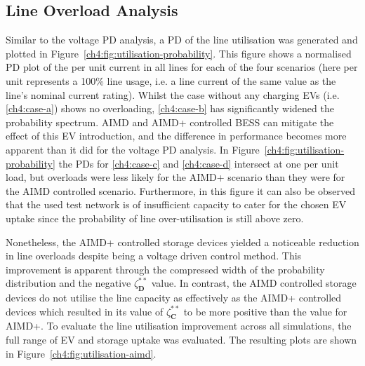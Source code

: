 \subsection{Line Overload Analysis}



Similar to the voltage PD analysis, a PD of the line utilisation was generated and plotted in Figure~\ref{ch4:fig:utilisation-probability}.
This figure shows a normalised PD plot of the per unit current in all lines for each of the four scenarios (here per unit represents a 100\% line usage, i.e. a line current of the same value as the line's nominal current rating).
Whilst the case without any charging EVs (i.e. \ref{ch4:case-a}) shows no overloading, \ref{ch4:case-b} has significantly widened the probability spectrum.
AIMD and AIMD+ controlled BESS can mitigate the effect of this EV introduction, and the difference in performance becomes more apparent than it did for the voltage PD analysis.
In Figure~\ref{ch4:fig:utilisation-probability} the PDs for \ref{ch4:case-c} and \ref{ch4:case-d} intersect at one per unit load, but overloads were less likely for the AIMD+ scenario than they were for the AIMD controlled scenario.
Furthermore, in this figure it can also be observed that the used test network is of insufficient capacity to cater for the chosen EV uptake since the probability of line over-utilisation is still above zero.

Nonetheless, the AIMD+ controlled storage devices yielded a noticeable reduction in line overloads despite being a voltage driven control method.
This improvement is apparent through the compressed width of the probability distribution and the negative $\zeta_\textbf{D}^{**}$ value.
In contrast, the AIMD controlled storage devices do not utilise the line capacity as effectively as the AIMD+ controlled devices which resulted in its value of $\zeta_\textbf{C}^{**}$ to be more positive than the value for AIMD+.
To evaluate the line utilisation improvement across all simulations, the full range of EV and storage uptake was evaluated.
The resulting plots are shown in Figure~\ref{ch4:fig:utilisation-aimd}.




